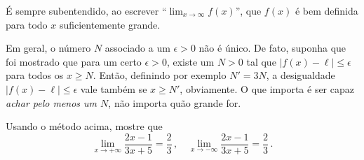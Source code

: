 \begin{obs}
É sempre subentendido, ao escrever ``$\lim_{x\to \infty}f(x)$'', que
$f(x)$ é bem definida para todo $x$ suficientemente grande.
\end{obs}

\begin{obs}
Em geral, o número $N$ associado a um
$\epsilon>0$ não é único. De fato, suponha que foi mostrado que para
um certo $\epsilon>0$, existe um $N>0$ tal que $|f(x)-\ell|\leq
\epsilon$ para todos os $x\geq N$. Então, definindo por exemplo $N'=3N$, 
a desigualdade $|f(x)-\ell|\leq \epsilon$ vale também se $x\geq
N'$, obviamente. O que importa é ser capaz \emph{achar pelo menos um
$N$}, não importa quão grande for.
\end{obs}

\begin{exo}\label{Ex:razaosimples}
Usando o método acima, mostre que
$$\lim_{x\to+\infty}\frac{2x-1}{3x+5}=\frac23\,,
\quad \lim_{x\to-\infty}\frac{2x-1}{3x+5}=\frac23
\,.$$
\begin{sol}


\end{sol}
\end{exo}
